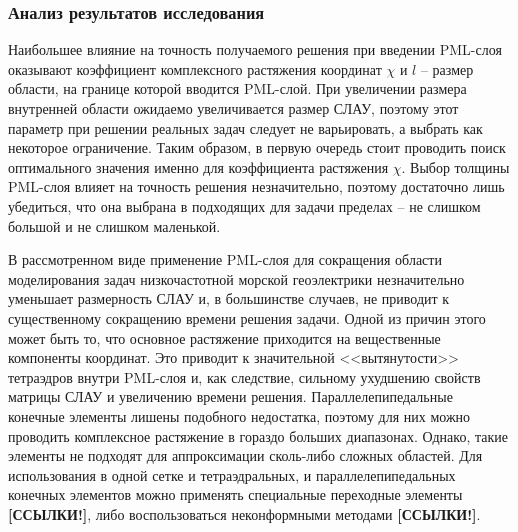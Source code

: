 \documentclass[a4paper,14pt]{article}
\begin{document}

\subsubsection{Анализ результатов исследования}
Наибольшее влияние на точность получаемого решения при введении PML-слоя оказывают коэффициент комплексного растяжения координат $\chi$ и $l$ -- размер области, на границе которой вводится PML-слой. При увеличении размера внутренней области ожидаемо увеличивается размер СЛАУ, поэтому этот параметр при решении реальных задач следует не варьировать, а выбрать как некоторое ограничение. Таким образом, в первую очередь стоит проводить поиск оптимального значения именно для коэффициента растяжения $\chi$. Выбор толщины PML-слоя влияет на точность решения незначительно, поэтому достаточно лишь убедиться, что она выбрана в подходящих для задачи пределах -- не слишком большой и не слишком маленькой.

В рассмотренном виде применение PML-слоя для сокращения области моделирования задач низкочастотной морской геоэлектрики незначительно уменьшает размерность СЛАУ и, в большинстве случаев, не приводит к существенному сокращению времени решения задачи. Одной из причин этого может быть то, что основное растяжение приходится на вещественные компоненты координат. Это приводит к значительной <<вытянутости>> тетраэдров внутри PML-слоя и, как следствие, сильному ухудшению свойств матрицы СЛАУ и увеличению времени решения. Параллелепипедальные конечные элементы лишены подобного недостатка, поэтому для них можно проводить комплексное растяжение в гораздо больших диапазонах. Однако, такие элементы не подходят для аппроксимации сколь-либо сложных областей. Для использования в одной сетке и тетраэдральных, и параллелепипедальных конечных элементов можно применять специальные переходные элементы {\color{red}\textbf{[ССЫЛКИ!]}}, либо воспользоваться неконформными методами {\color{red}\textbf{[ССЫЛКИ!]}}. %

\end{document}
